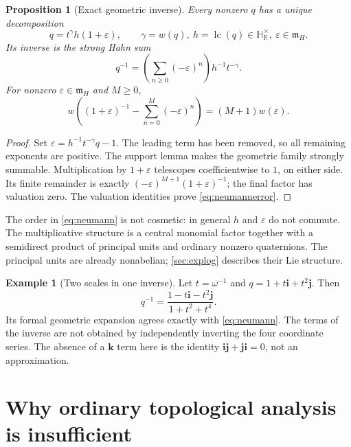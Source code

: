 \documentclass[11pt,letterpaper]{article}
\numberwithin{equation}{section}
\newtheorem{proposition}[proposition]{Proposition}
\theoremstyle{definition}
\newtheorem{example}[example]{Example}
\theoremstyle{remark}
\newcommand{\HR}{\mathbb H_{\mathbb R}}
\newcommand{\mm}{\mathfrak m}
\newcommand{\eps}{\varepsilon}
\newcommand{\ii}{\mathbf i}
\newcommand{\jj}{\mathbf j}
\newcommand{\kk}{\mathbf k}
\newcommand{\lc}{\operatorname{lc}}
\begin{document}
\begin{proposition}[Exact geometric inverse]\label{prop:neumann}
Every nonzero $q$ has a unique decomposition
\begin{equation}\label{eq:leadingdecomp}
 q=t^\gamma h(1+\eps),\qquad
 \gamma=w(q),\ h=\lc(q)\in\HR^\times,\ \eps\in\mm_H.
\end{equation}
Its inverse is the strong Hahn sum
\begin{equation}\label{eq:neumann}
 q^{-1}=\left(\sum_{n\ge0}(-\eps)^n\right)h^{-1}t^{-\gamma}.
\end{equation}
For nonzero $\eps\in\mm_H$ and $M\ge0$,
\begin{equation}\label{eq:neumannerror}
 w\left((1+\eps)^{-1}-\sum_{n=0}^M(-\eps)^n\right)
 =(M+1)w(\eps).
\end{equation}
\end{proposition}
\begin{proof}
Set $\eps=h^{-1}t^{-\gamma}q-1$. The leading term has been removed, so all remaining
exponents are positive. The support lemma makes the geometric family strongly summable.
Multiplication by $1+\eps$ telescopes coefficientwise to $1$, on either side. Its finite
remainder is exactly $(-\eps)^{M+1}(1+\eps)^{-1}$; the final factor has valuation zero.
The valuation identities prove \eqref{eq:neumannerror}.
\end{proof}

The order in \eqref{eq:neumann} is not cosmetic: in general $h$ and $\eps$ do not commute.
The multiplicative structure is a central monomial factor together with a semidirect product
of principal units and ordinary nonzero quaternions. The principal units are already
nonabelian; \cref{sec:explog} describes their Lie structure.

\begin{example}[Two scales in one inverse]
Let $t=\omega^{-1}$ and $q=1+t\ii+t^2\jj$. Then
\[
 q^{-1}=\frac{1-t\ii-t^2\jj}{1+t^2+t^4}.
\]
Its formal geometric expansion agrees exactly with \eqref{eq:neumann}. The terms of the
inverse are not obtained by independently inverting the four coordinate series. The absence
of a $\kk$ term here is the identity $\ii\jj+\jj\ii=0$, not an approximation.
\end{example}

\section{Why ordinary topological analysis is insufficient}\label{sec:topology}
\end{document}
